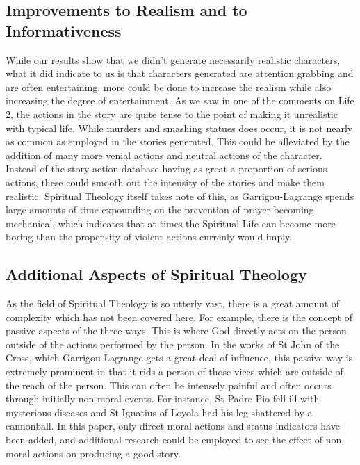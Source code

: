 \documentclass[12pt]{article}
\begin{document}
\subsection{Improvements to Realism and to Informativeness}
While our results show that we didn't generate necessarily realistic characters, what it did indicate to us is that characters generated are attention grabbing and are often entertaining, more could be done to increase the realism while also increasing the degree of entertainment. As we saw in one of the comments on Life 2, the actions in the story are quite tense to the point of making it unrealistic with typical life. While murders and smashing statues does occur, it is not nearly as common as employed in the stories generated. This could be alleviated by the addition of many more venial actions and neutral actions of the character. Instead of the story action database having as great a proportion of serious actions, these could smooth out the intensity of the stories and make them realistic. Spiritual Theology itself takes note of this, as Garrigou-Lagrange spends large amounts of time expounding on the prevention of prayer becoming mechanical, which indicates that at times the Spiritual Life can become more boring\cite{garrigou2013three} than the propensity of violent actions currenly would imply.\\


\subsection{Additional Aspects of Spiritual Theology}
As the field of Spiritual Theology is so utterly vast, there is a great amount of complexity which has not been covered here. For example, there is the concept of passive aspects of the three ways. This is where God directly acts on the person outside of the actions performed by the person. In the works of St John of the Cross, which Garrigou-Lagrange gets a great deal of influence, this passive way is extremely prominent in that it rids a person of those vices which are outside of the reach of the person. This can often be intensely painful and often occurs through initially non moral events. For instance, St Padre Pio fell ill with mysterious diseases \cite{allegri2000padre} and St Ignatius of Loyola had his leg shattered by a cannonball\cite{loyola2009autobiography}. In this paper, only direct moral actions and status indicators have been added, and additional research could be employed to see the effect of non-moral actions on producing a good story. \\
\end{document}
